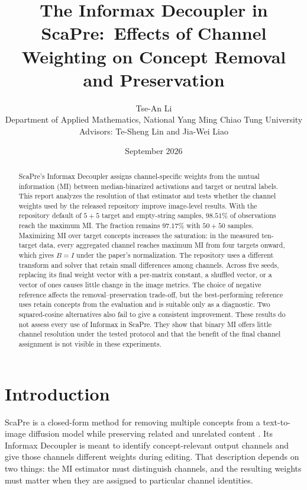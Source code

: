 \documentclass[11pt]{article}
\title{The Informax Decoupler in ScaPre:\
Effects of Channel Weighting on Concept Removal and Preservation}
\author{Tse-An Li\\
Department of Applied Mathematics, National Yang Ming Chiao Tung University\\
Advisors: Te-Sheng Lin and Jia-Wei Liao}
\date{September 2026}
\begin{document}
\maketitle

\begin{abstract}
ScaPre's Informax Decoupler assigns channel-specific weights from the mutual information (MI) between median-binarized activations and target or neutral labels. This report analyzes the resolution of that estimator and tests whether the channel weights used by the released repository improve image-level results. With the repository default of $5+5$ target and empty-string samples, $98.51\%$ of observations reach the maximum MI. The fraction remains $97.17\%$ with $50+50$ samples. Maximizing MI over target concepts increases the saturation: in the measured ten-target data, every aggregated channel reaches maximum MI from four targets onward, which gives $B=I$ under the paper's normalization. The repository uses a different transform and solver that retain small differences among channels. Across five seeds, replacing its final weight vector with a per-matrix constant, a shuffled vector, or a vector of ones causes little change in the image metrics. The choice of negative reference affects the removal--preservation trade-off, but the best-performing reference uses retain concepts from the evaluation and is suitable only as a diagnostic. Two squared-cosine alternatives also fail to give a consistent improvement. These results do not assess every use of Informax in ScaPre. They show that binary MI offers little channel resolution under the tested protocol and that the benefit of the final channel assignment is not visible in these experiments.
\end{abstract}

\begingroup
\small
\tableofcontents
\endgroup
\newpage

\section{Introduction}
ScaPre is a closed-form method for removing multiple concepts from a text-to-image diffusion model while preserving related and unrelated content \cite{scapre}. Its Informax Decoupler is meant to identify concept-relevant output channels and give those channels different weights during editing. That description depends on two things: the MI estimator must distinguish channels, and the resulting weights must matter when they are assigned to particular channel identities.
\end{document}

